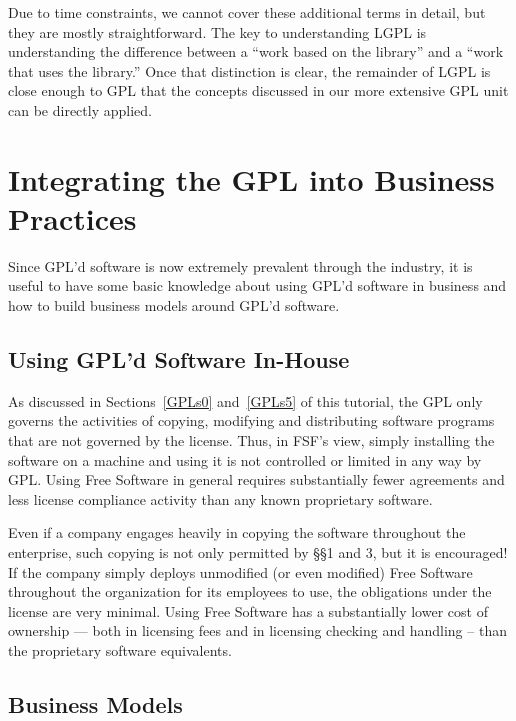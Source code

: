 \documentclass[11pt, letterpaper]{book}
\begin{document}
Due to time constraints, we cannot cover these additional terms in detail,
but they are mostly straightforward. The key to understanding LGPL is
understanding the difference between a ``work based on the library'' and a
``work that uses the library.''  Once that distinction is clear, the
remainder of LGPL is close enough to GPL that the concepts discussed in
our more extensive GPL unit can be directly applied.

\chapter{Integrating the GPL into Business Practices}

Since GPL'd software is now extremely prevalent through the industry, it
is useful to have some basic knowledge about using GPL'd software in
business and how to build business models around GPL'd software.

\section{Using GPL'd Software In-House}

As discussed in Sections~\ref{GPLs0} and~\ref{GPLs5} of this tutorial,
the GPL only governs the activities of copying, modifying and
distributing software programs that are not governed by the license.
Thus, in FSF's view, simply installing the software on a machine and
using it is not controlled or limited in any way by GPL\@. Using Free
Software in general requires substantially fewer agreements and less
license compliance activity than any known proprietary software.

Even if a company engages heavily in copying the software throughout the
enterprise, such copying is not only permitted by \S\S 1 and 3, but it is
encouraged!  If the company simply deploys unmodified (or even modified)
Free Software throughout the organization for its employees to use, the
obligations under the license are very minimal. Using Free Software has a
substantially lower cost of ownership --- both in licensing fees and in
licensing checking and handling -- than the proprietary software
equivalents.

\section{Business Models}
\label{Business Models}
\end{document}
